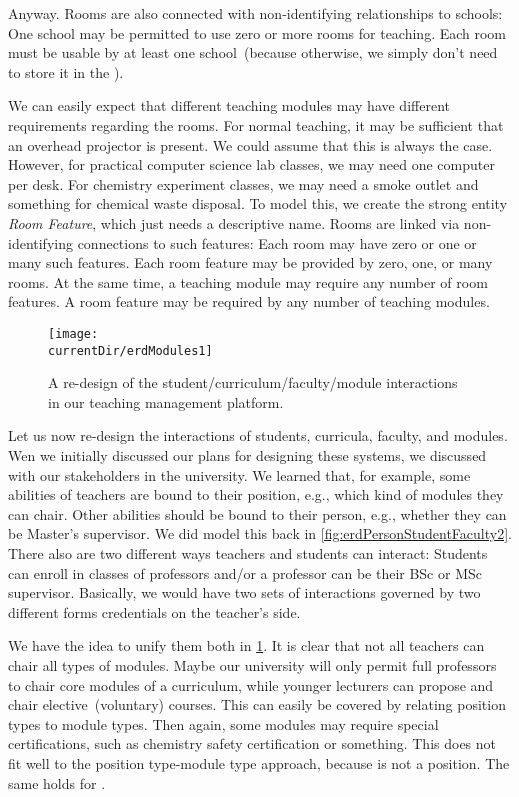 Anyway.
Rooms are also connected with non-identifying relationships to schools:
One school may be permitted to use zero or more rooms for teaching.
Each room must be usable by at least one school~(because otherwise, we simply don't need to store it in the \db).

We can easily expect that different teaching modules may have different requirements regarding the rooms.
For normal teaching, it may be sufficient that an overhead projector is present.
We could assume that this is always the case.
However, for practical computer science lab classes, we may need one computer per desk.
For chemistry experiment classes, we may need a smoke outlet and something for chemical waste disposal.
To model this, we create the strong entity \emph{Room Feature}, which just needs a descriptive name.
Rooms are linked via non-identifying connections to such features:
Each room may have zero or one or many such features.
Each room feature may be provided by zero, one, or many rooms.
At the same time, a teaching module may require any number of room features.
A room feature may be required by any number of teaching modules.

\begin{figure}%
\centering%
\texttt{[image: \\currentDir/erdModules1]}%
\caption{A re-design of the student/curriculum/faculty/module interactions in our teaching management platform.}%
\label{fig:erdModules1}%
\end{figure}%
%
Let us now re-design the interactions of students, curricula, faculty, and modules.
Wen we initially discussed our plans for designing these systems, we discussed with our stakeholders in the university.
We learned that, for example, some abilities of teachers are bound to their position, e.g., which kind of modules they can chair.
Other abilities should be bound to their person, e.g., whether they can be Master's supervisor.
We did model this back in \cref{fig:erdPersonStudentFaculty2}.
There also are two different ways teachers and students can interact:
Students can enroll in classes of professors and/or a professor can be their BSc or MSc supervisor.
Basically, we would have two sets of interactions governed by two different forms credentials on the teacher's side.

We have the idea to unify them both in \cref{fig:erdModules1}.
It is clear that not all teachers can chair all types of modules.
Maybe our university will only permit full professors to chair core modules of a curriculum, while younger lecturers can propose and chair elective~(voluntary) courses.
This can easily be covered by relating position types to module types.
Then again, some modules may require special certifications, such as chemistry safety certification or something.
This does not fit well to the position type-module type approach, because  is not a position.
The same holds for .

